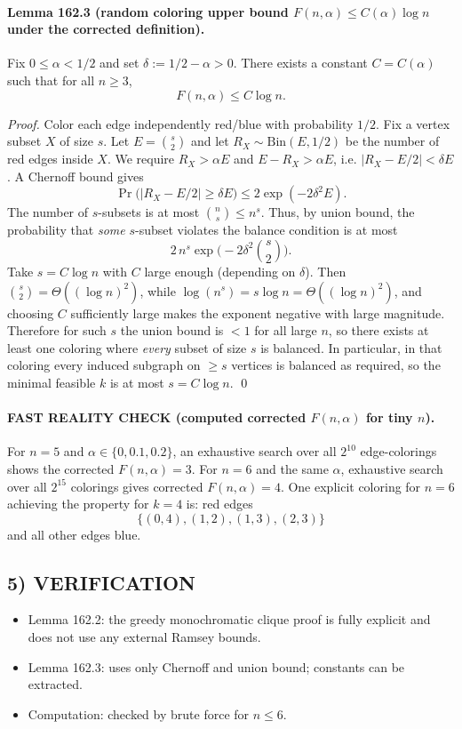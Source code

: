 \paragraph{Lemma 162.3 (random coloring upper bound $F(n,\alpha)\le C(\alpha)\log n$ under the corrected definition).}
Fix $0\le \alpha<1/2$ and set $\delta:=1/2-\alpha>0$.
There exists a constant $C=C(\alpha)$ such that for all $n\ge 3$,
\[
F(n,\alpha)\le C\log n.
\]

\textit{Proof.}
Color each edge independently red/blue with probability $1/2$.
Fix a vertex subset $X$ of size $s$. Let $E=\binom{s}{2}$ and let $R_X\sim \mathrm{Bin}(E,1/2)$ be the number of red edges inside $X$.
We require $R_X>\alpha E$ and $E-R_X>\alpha E$, i.e. $|R_X-E/2|<\delta E$.
A Chernoff bound gives
\[
\Pr\big(|R_X-E/2|\ge \delta E\big)\le 2\exp(-2\delta^2 E).
\]
The number of $s$-subsets is at most $\binom{n}{s}\le n^s$.
Thus, by union bound, the probability that \emph{some} $s$-subset violates the balance condition is at most
\[
2\,n^s\exp\big(-2\delta^2\binom{s}{2}\big).
\]
Take $s=C\log n$ with $C$ large enough (depending on $\delta$). Then $\binom{s}{2}=\Theta((\log n)^2)$, while $\log(n^s)=s\log n=\Theta((\log n)^2)$, and choosing $C$ sufficiently large makes the exponent negative with large magnitude.
Therefore for such $s$ the union bound is $<1$ for all large $n$, so there exists at least one coloring where \emph{every} subset of size $s$ is balanced.
In particular, in that coloring every induced subgraph on $\ge s$ vertices is balanced as required, so the minimal feasible $k$ is at most $s=C\log n$. \qed

\paragraph{FAST REALITY CHECK (computed corrected $F(n,\alpha)$ for tiny $n$).}
For $n=5$ and $\alpha\in\{0,0.1,0.2\}$, an exhaustive search over all $2^{10}$ edge-colorings shows the corrected $F(n,\alpha)=3$.
For $n=6$ and the same $\alpha$, exhaustive search over all $2^{15}$ colorings gives corrected $F(n,\alpha)=4$.
One explicit coloring for $n=6$ achieving the property for $k=4$ is: red edges
\[
\{(0,4),(1,2),(1,3),(2,3)\}
\]
and all other edges blue.

\subsection*{5) VERIFICATION}
\begin{itemize}
\item Lemma 162.2: the greedy monochromatic clique proof is fully explicit and does not use any external Ramsey bounds.
\item Lemma 162.3: uses only Chernoff and union bound; constants can be extracted.
\item Computation: checked by brute force for $n\le 6$.
\end{itemize}

